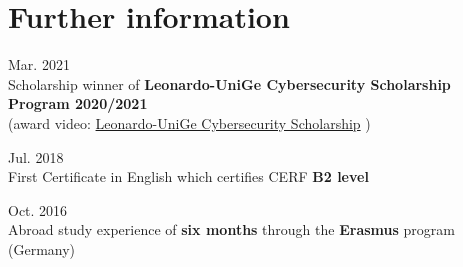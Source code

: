 \documentclass[a4paper,10pt]{article}
\newcommand{\MySkip}{
\vskip12pt
}
\newcommand{\myhref}[2]{%
\href{#1}{\textcolor{ColorTwo}{#2}}
}
\begin{document}
\hfill
%
\begin{adjustbox}{valign=t}
\begin{minipage}{0.6\textwidth} %
\section*{Further information}
\begin{description}
	\raggedright
	\item \textcolor{ColorOne}{Mar. 2021}\\
	Scholarship winner of \textbf{Leonardo-UniGe Cybersecurity Scholarship Program 2020/2021}\\
    (award video: \myhref{https://www.youtube.com/watch?v=gA4rcqAIaZg}{Leonardo-UniGe Cybersecurity Scholarship})
    \item \textcolor{ColorOne}{Jul. 2018}\\
    First Certificate in English which certifies CERF \textbf{B2 level}
    \item \textcolor{ColorOne}{Oct. 2016}\\
    Abroad study experience of \textbf{six months} through the \textbf{Erasmus} program (Germany)
\end{description}

\MySkip
\end{minipage}
\end{adjustbox}
\end{document}
